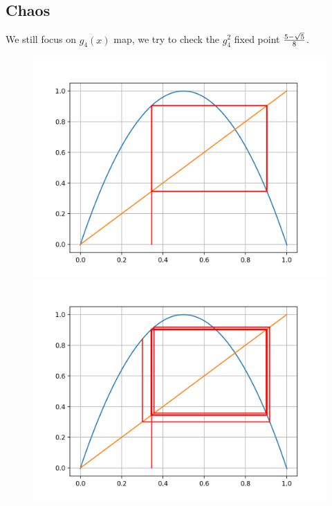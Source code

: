 \documentclass[12pt]{article}
\theoremstyle{plain}
\begin{document}
\subsection{Chaos}
We still focus on $g_4(x)$ map, we try to check the $g_4^2$ fixed point ${5 - \sqrt{5}\over 8}$.\\[2ex]

\begin{figure}[H]
\begin{minipage}[c][0.24\width]{0.24\textwidth}
   \centering
   \includegraphics[width=\textwidth]{figure/section1/4-logistic-stable-30.png}
\end{minipage}
\begin{minipage}[c][0.24\width]{0.24\textwidth}
   \centering
   \includegraphics[width=\textwidth]{figure/section1/4-logistic-stable-50.png}

\end{minipage}
\end{figure}
\end{document}
